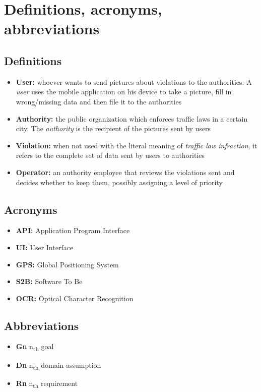 \section{Definitions, acronyms, abbreviations}

\subsection{Definitions}
\begin{itemize}
    \item \textbf{User:} whoever wants to send pictures about violations to the authorities. A \emph{user} uses the mobile application on his device to take a picture, fill in wrong/missing data and then file it to the authorities
    \item \textbf{Authority:} the public organization which enforces traffic laws in a certain city. The \emph{authority} is the recipient of the pictures sent by users
    \item \textbf{Violation:} when not used with the literal meaning of \emph{traffic law infraction}, it refers to the complete set of data sent by users to authorities
    \item \textbf{Operator:} an authority employee that reviews the violations sent and decides whether to keep them, possibly assigning a level of priority
\end{itemize}

\subsection{Acronyms}
\begin{itemize}
    \item \textbf{API:} Application Program Interface
    \item \textbf{UI:} User Interface
    \item \textbf{GPS:} Global Positioning System
    \item \textbf{S2B:} Software To Be
    \item \textbf{OCR:} Optical Character Recognition
\end{itemize}

\subsection{Abbreviations}
\begin{itemize}
    \item \textbf{Gn} n\textsubscript{th} goal
    \item \textbf{Dn} n\textsubscript{th} domain assumption
    \item \textbf{Rn} n\textsubscript{th} requirement
\end{itemize}